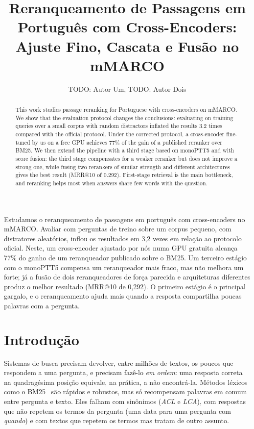 \documentclass[12pt]{article}
\title{Reranqueamento de Passagens em Português com Cross-Encoders:\\
Ajuste Fino, Cascata e Fusão no mMARCO}
\author{TODO: Autor Um\inst{1}, TODO: Autor Dois\inst{1}}
\begin{document}
\maketitle

\begin{abstract}
This work studies passage reranking for Portuguese with cross-encoders on mMARCO. We show that the evaluation protocol changes the conclusions:
evaluating on training queries over a small corpus with random distractors inflated the
results 3.2 times compared with the official protocol. Under the corrected protocol, a
cross-encoder fine-tuned by us on a free GPU achieves 77\% of the gain of a published
reranker over BM25. We then extend the pipeline with a third stage based on monoPTT5 and
with score fusion: the third stage compensates for a weaker reranker but does not improve
a strong one, while fusing two rerankers of similar strength and different architectures
gives the best result (MRR@10 of 0.292). First-stage retrieval is the main bottleneck, and
reranking helps most when answers share few words with the question.
\end{abstract}

\begin{resumo}
Estudamos o reranqueamento de passagens em português com cross-encoders no mMARCO.
Avaliar com perguntas de treino sobre um corpus pequeno, com distratores aleatórios, inflou
os resultados em 3,2 vezes em relação ao protocolo oficial. Neste, um cross-encoder
ajustado por nós numa GPU gratuita alcança 77\% do ganho de um reranqueador publicado
sobre o BM25. Um terceiro estágio com o monoPTT5 compensa um reranqueador mais fraco, mas
não melhora um forte; já a fusão de dois reranqueadores de força parecida e arquiteturas
diferentes produz o melhor resultado (MRR@10 de 0,292). O primeiro estágio é o principal gargalo, e o reranqueamento ajuda mais
quando a resposta compartilha poucas palavras com a pergunta.
\end{resumo}

\section{Introdução}
\label{sec:intro}

Sistemas de busca precisam devolver, entre milhões de textos, os poucos que respondem a uma
pergunta, e precisam fazê-lo \emph{em ordem}: uma resposta correta na quadragésima posição
equivale, na prática, a não encontrá-la. Métodos léxicos como o BM25~\cite{robertson:2009}
são rápidos e robustos, mas só recompensam palavras em comum entre pergunta e texto. Eles
falham com sinônimos (\textit{ACL} e \textit{LCA}), com respostas que não repetem os termos da
pergunta (uma data para uma pergunta com \textit{quando}) e com textos que repetem os termos
mas tratam de outro assunto.
\end{document}
